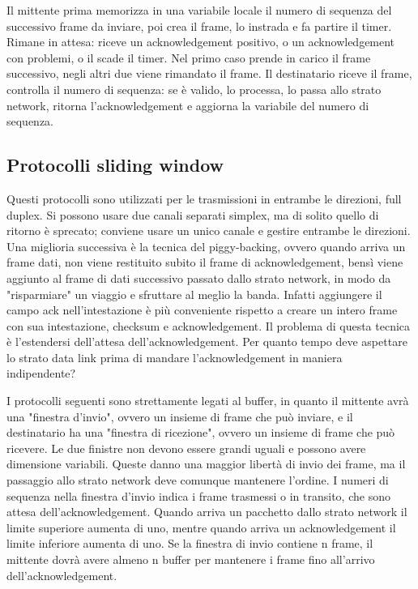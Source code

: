 Il mittente prima memorizza in una variabile locale il numero di sequenza del successivo frame da inviare, poi crea il frame, lo instrada e fa partire il timer.
Rimane in attesa: riceve un acknowledgement positivo, o un acknowledgement con problemi, o il scade il timer.
Nel primo caso prende in carico il frame successivo, negli altri due viene rimandato il frame.
Il destinatario riceve il frame, controlla il numero di sequenza: 
se è valido, lo processa, lo passa allo strato network, ritorna l'acknowledgement e aggiorna la variabile del numero di sequenza.

\subsection{Protocolli sliding window} %
Questi protocolli sono utilizzati per le trasmissioni in entrambe le direzioni, full duplex.
Si possono usare due canali separati simplex, ma di solito quello di ritorno è sprecato; conviene usare un unico canale e gestire entrambe le direzioni.
Una miglioria successiva è la tecnica del piggy-backing, ovvero quando arriva un frame dati, non viene restituito subito il frame di acknowledgement, 
bensì viene aggiunto al frame di dati successivo passato dallo strato network, in modo da "risparmiare" un viaggio e sfruttare al meglio la banda.
Infatti aggiungere il campo ack nell'intestazione è più conveniente rispetto a creare un intero frame con sua intestazione, checksum e acknowledgement.
Il problema di questa tecnica è l'estendersi dell'attesa dell'acknowledgement.
Per quanto tempo deve aspettare lo strato data link prima di mandare l'acknowledgement in maniera indipendente?

I protocolli seguenti sono strettamente legati al buffer, in quanto il mittente avrà una "finestra d'invio", ovvero un insieme di frame che può inviare,
e il destinatario ha una "finestra di ricezione", ovvero un insieme di frame che può ricevere.
Le due finistre non devono essere grandi uguali e possono avere dimensione variabili.
Queste danno una maggior libertà di invio dei frame, ma il passaggio allo strato network deve comunque mantenere l'ordine.
I numeri di sequenza nella finestra d'invio indica i frame trasmessi o in transito, che sono attesa dell'acknowledgement.
Quando arriva un pacchetto dallo strato network il limite superiore aumenta di uno, mentre quando arriva un acknowledgement il limite inferiore aumenta di uno.
Se la finestra di invio contiene n frame, il mittente dovrà avere almeno n buffer per mantenere i frame fino all'arrivo dell'acknowledgement.

